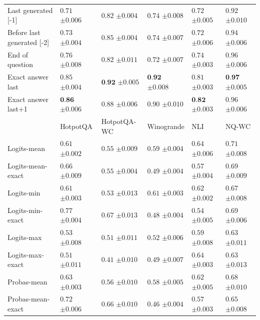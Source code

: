 \begin{table}[t]
{\begin{tabular}{l|lllll}
Last generated [-1] & $0.71$ \tiny$\pm 0.006$ & $0.82$ \tiny$\pm 0.004$ & $0.74$ \tiny$\pm 0.008$ & $0.72$ \tiny$\pm 0.005$ & $0.92$ \tiny$\pm 0.010$ \\
Before last generated [-2] & $0.73$ \tiny$\pm 0.004$ & $0.85$ \tiny$\pm 0.004$ & $0.74$ \tiny$\pm 0.007$ & $0.72$ \tiny$\pm 0.006$ & $0.94$ \tiny$\pm 0.006$ \\
End of question & $0.76$ \tiny$\pm 0.008$ & $0.82$ \tiny$\pm 0.011$ & $0.72$ \tiny$\pm 0.007$ & $0.74$ \tiny$\pm 0.003$ & $0.96$ \tiny$\pm 0.006$ \\
\midrule
Exact answer last & $0.85$ \tiny$\pm 0.004$ & $\textbf{0.92}$ \tiny$\pm 0.005$ & $\textbf{0.92}$ \tiny$\pm 0.008$ & $0.81$ \tiny$\pm 0.003$ & $\textbf{0.97}$ \tiny$\pm 0.005$ \\
Exact answer last+1 & $\textbf{0.86}$ \tiny$\pm 0.006$ & $0.88$ \tiny$\pm 0.006$ & $0.90$ \tiny$\pm 0.010$ & $\textbf{0.82}$ \tiny$\pm 0.003$ & $0.96$ \tiny$\pm 0.006$ \\
     \midrule
    & HotpotQA & HotpotQA-WC & Winogrande & NLI & NQ-WC \\
    \midrule
    Logits-mean & $0.61$ \tiny$\pm 0.002$ & $0.55$ \tiny$\pm 0.009$ & $0.59$ \tiny$\pm 0.004$ & $0.64$ \tiny$\pm 0.006$ & $0.71$ \tiny$\pm 0.008$ \\
Logits-mean-exact & $0.66$ \tiny$\pm 0.009$ & $0.55$ \tiny$\pm 0.004$ & $0.49$ \tiny$\pm 0.004$ & $0.57$ \tiny$\pm 0.004$ & $0.69$ \tiny$\pm 0.009$ \\
Logits-min & $0.61$ \tiny$\pm 0.003$ & $0.53$ \tiny$\pm 0.013$ & $0.61$ \tiny$\pm 0.003$ & $0.62$ \tiny$\pm 0.002$ & $0.67$ \tiny$\pm 0.008$ \\
Logits-min-exact & $0.77$ \tiny$\pm 0.004$ & $0.67$ \tiny$\pm 0.013$ & $0.48$ \tiny$\pm 0.004$ & $0.54$ \tiny$\pm 0.005$ & $0.69$ \tiny$\pm 0.006$ \\
Logits-max & $0.53$ \tiny$\pm 0.008$ & $0.51$ \tiny$\pm 0.011$ & $0.52$ \tiny$\pm 0.006$ & $0.59$ \tiny$\pm 0.008$ & $0.63$ \tiny$\pm 0.011$ \\
Logits-max-exact & $0.51$ \tiny$\pm 0.011$ & $0.41$ \tiny$\pm 0.010$ & $0.49$ \tiny$\pm 0.007$ & $0.64$ \tiny$\pm 0.003$ & $0.63$ \tiny$\pm 0.013$ \\
Probas-mean & $0.63$ \tiny$\pm 0.003$ & $0.56$ \tiny$\pm 0.010$ & $0.58$ \tiny$\pm 0.005$ & $0.62$ \tiny$\pm 0.005$ & $0.68$ \tiny$\pm 0.010$ \\
Probas-mean-exact & $0.72$ \tiny$\pm 0.006$ & $0.66$ \tiny$\pm 0.010$ & $0.46$ \tiny$\pm 0.004$ & $0.57$ \tiny$\pm 0.003$ & $0.65$ \tiny$\pm 0.008$ \\

\end{tabular}}
\end{table}
